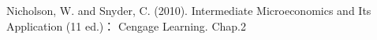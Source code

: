\documentclass[10pt, a4paper]{ctexart} %
\begin{document}



\small
\begin{thebibliography}{99}
	\setlength{\parskip}{0pt} %
	 Nicholson, W. and Snyder, C. (2010). Intermediate Microeconomics and Its Application (11 ed.)： Cengage Learning. Chap.2
	\end {thebibliography}
\end{document}

